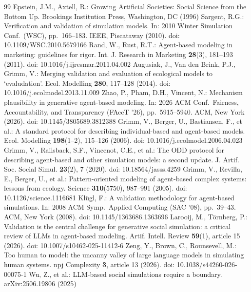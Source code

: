 \documentclass[runningheads]{llncs}
\begin{document}
\begin{thebibliography}{99}
Epstein, J.M., Axtell, R.: Growing Artificial Societies: Social Science from the Bottom Up. Brookings Institution Press, Washington, DC (1996)
Sargent, R.G.: Verification and validation of simulation models. In: 2010 Winter Simulation Conf.\ (WSC), pp.\ 166--183. IEEE, Piscataway (2010). doi: 10.1109/WSC.2010.5679166
Rand, W., Rust, R.T.: Agent-based modeling in marketing: guidelines for rigor. Int. J. Research in Marketing \textbf{28}(3), 181--193 (2011). doi: 10.1016/j.ijresmar.2011.04.002
Augusiak, J., Van den Brink, P.J., Grimm, V.: Merging validation and evaluation of ecological models to `evaludation'. Ecol. Modelling \textbf{280}, 117--128 (2014). doi: 10.1016/j.ecolmodel.2013.11.009
Zhao, P., Pham, D.H., Vincent, N.: Mechanism plausibility in generative agent-based modeling. In: 2026 ACM Conf.\ Fairness, Accountability, and Transparency (FAccT '26), pp.\ 5915--5940. ACM, New York (2026). doi: 10.1145/3805689.3812388
Grimm, V., Berger, U., Bastiansen, F., et al.: A standard protocol for describing individual-based and agent-based models. Ecol. Modelling \textbf{198}(1--2), 115--126 (2006). doi: 10.1016/j.ecolmodel.2006.04.023
Grimm, V., Railsback, S.F., Vincenot, C.E., et al.: The ODD protocol for describing agent-based and other simulation models: a second update. J. Artif. Soc. Social Simul. \textbf{23}(2), 7 (2020). doi: 10.18564/jasss.4259
Grimm, V., Revilla, E., Berger, U., et al.: Pattern-oriented modeling of agent-based complex systems: lessons from ecology. Science \textbf{310}(5750), 987--991 (2005). doi: 10.1126/science.1116681
Kl\"ugl, F.: A validation methodology for agent-based simulations. In: 2008 ACM Symp.\ Applied Computing (SAC '08), pp.\ 39--43. ACM, New York (2008). doi: 10.1145/1363686.1363696
Larooij, M., T{\"o}rnberg, P.: Validation is the central challenge for generative social simulation: a critical review of LLMs in agent-based modeling. Artif. Intell. Review \textbf{59}(1), article 15 (2026). doi: 10.1007/s10462-025-11412-6
Zeng, Y., Brown, C., Rounsevell, M.: Too human to model: the uncanny valley of large language models in simulating human systems. npj Complexity \textbf{3}, article 13 (2026). doi: 10.1038/s44260-026-00075-1
Wu, Z., et al.: LLM-based social simulations require a boundary. arXiv:2506.19806 (2025)

\end{thebibliography}
\end{document}
